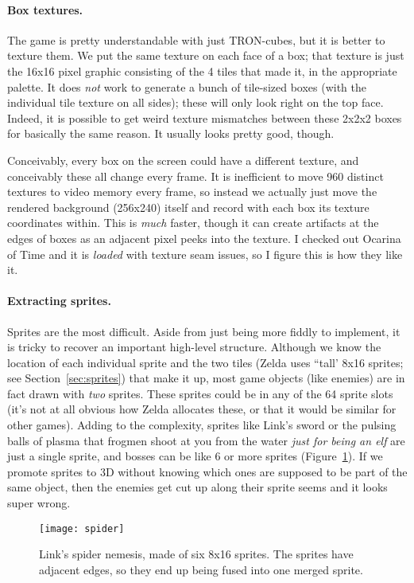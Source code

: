 \documentclass[twocolumn]{article}
\begin{document}
\paragraph{Box textures.}
The game is pretty understandable with just TRON-cubes, but it is
better to texture them. We put the same texture on each face of a box;
that texture is just the 16x16 pixel graphic consisting of the 4 tiles
that made it, in the appropriate palette. It does {\it not} work to
generate a bunch of tile-sized boxes (with the individual tile texture
on all sides); these will only look right on the top face. Indeed, it
is possible to get weird texture mismatches between these 2x2x2 boxes
for basically the same reason. It usually looks pretty good, though.

Conceivably, every box on the screen could have a different texture,
and conceivably these all change every frame. It is inefficient to
move 960 distinct textures to video memory every frame, so instead we
actually just move the rendered background (256x240) itself and record
with each box its texture coordinates within. This is {\it much}
faster, though it can create artifacts at the edges of boxes as an
adjacent pixel peeks into the texture. I checked out Ocarina of Time
and it is {\it loaded} with texture seam issues, so I figure this is
how they like it.

\paragraph{Extracting sprites.}
Sprites are the most difficult. Aside from just being more fiddly to
implement, it is tricky to recover an important high-level structure.
Although we know the location of each individual sprite and the two tiles
(Zelda uses ``tall' 8x16 sprites; see Section~\ref{sec:sprites}) that
make it up, most game objects (like enemies) are in fact drawn with
{\it two} sprites. These sprites could be in any of the 64 sprite
slots (it's not at all obvious how Zelda allocates these, or that it
would be similar for other games). Adding to the complexity, sprites
like Link's sword or the pulsing balls of plasma that frogmen shoot
at you from the water {\it just for being an elf} are just a single
sprite, and bosses can be like 6 or more sprites (Figure~\ref{fig:spider}). If we
promote sprites to 3D without knowing which ones are supposed to be
part of the same object, then the enemies get cut up along their
sprite seems and it looks super wrong.

\begin{figure}[ht]
\begin{center}
\texttt{[image: spider]}
\end{center}\vspace{-0.1in}
\caption{Link's spider nemesis, made of six 8x16 sprites. The sprites
have adjacent edges, so they end up being fused into one merged sprite.
} \label{fig:spider}
\end{figure}
\end{document}
